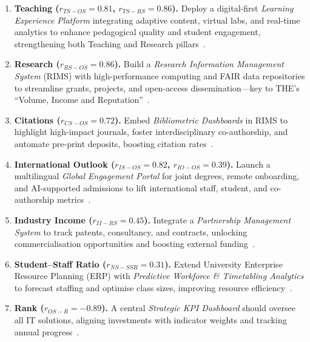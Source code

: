 \documentclass[conference]{IEEEtran}
\begin{document}
\begin{enumerate}
	\item \textbf{Teaching ($r_{TS-OS}=0.81$, $r_{TS-RS}=0.86$).} Deploy a digital-first \emph{Learning Experience Platform} integrating adaptive content, virtual labs, and real-time analytics to enhance pedagogical quality and student engagement, strengthening both Teaching and Research pillars~\cite{azough2021digital,cheng2022ai}.
	
	\item \textbf{Research ($r_{RS-OS}=0.86$).} Build a \emph{Research Information Management System} (RIMS) with high-performance computing and FAIR data repositories to streamline grants, projects, and open-access dissemination—key to THE’s “Volume, Income and Reputation”~\cite{tenopir2011data,robinson2019rims}.
	
	\item \textbf{Citations ($r_{CS-OS}=0.72$).} Embed \emph{Bibliometric Dashboards} in RIMS to highlight high-impact journals, foster interdisciplinary co-authorship, and automate pre-print deposits, boosting citation rates~\cite{moed2005citation,borner2010structure}.
	
	\item \textbf{International Outlook ($r_{IS-OS}=0.82$, $r_{IO-OS}=0.39$).} Launch a multilingual \emph{Global Engagement Portal} for joint degrees, remote onboarding, and AI-supported admissions to lift international staff, student, and co-authorship metrics~\cite{boeren2023global,dewit2020internationalisation}.
	
	\item \textbf{Industry Income ($r_{II-RS}=0.45$).} Integrate a \emph{Partnership Management System} to track patents, consultancy, and contracts, unlocking commercialisation opportunities and boosting external funding~\cite{perkmann2013academic,sengupta2023value}.
	
	\item \textbf{Student–Staff Ratio ($r_{NS-SSR}=0.31$).} Extend University Enterprise Resource Planning (ERP) with \emph{Predictive Workforce \& Timetabling Analytics} to forecast staffing and optimise class sizes, improving resource efficiency~\cite{abbas2020forecasting,panagiotopoulos2021learning}.
	
	\item \textbf{Rank ($r_{OS-R}=-0.89$).} A central \emph{Strategic KPI Dashboard} should oversee all IT solutions, aligning investments with indicator weights and tracking annual progress~\cite{agbo2023dashboards,gunawardena2021digital}.
	

\end{enumerate}
\end{document}
